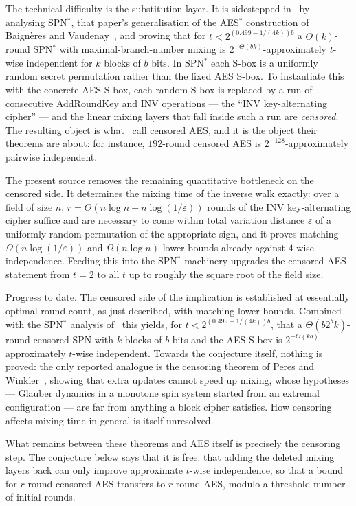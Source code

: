 \documentclass{aicr-conjecture}
\newcommand{\INV}{\mathrm{INV}}
\begin{document}
The technical difficulty is the substitution layer. It is sidestepped
in~\cite{LPTV23} by analysing SPN$^{*}$, that paper's generalisation of the
AES$^{*}$ construction of Baign\`eres and Vaudenay~\cite{BV05}, and proving
that for $t < 2^{(0.499 - 1/(4k))b}$ a $\Theta(k)$-round SPN$^{*}$ with
maximal-branch-number mixing is $2^{-\Theta(bk)}$-approximately $t$-wise
independent for $k$ blocks of $b$ bits. In SPN$^{*}$ each S-box is a
uniformly random secret permutation rather than the fixed AES S-box. To
instantiate this with the concrete AES S-box, each random S-box is replaced
by a run of consecutive AddRoundKey and $\INV$ operations --- the ``$\INV$
key-alternating cipher'' --- and the linear mixing layers that fall inside
such a run are \emph{censored}. The resulting object is what~\cite{LPTV23}
call censored AES, and it is the object their theorems are about: for
instance, $192$-round censored AES is $2^{-128}$-approximately pairwise
independent.

The present source removes the remaining quantitative bottleneck on the
censored side. It determines the mixing time of the inverse walk exactly:
over a field of size $n$, $r = \Theta(n \log n + n \log(1/\varepsilon))$
rounds of the $\INV$ key-alternating cipher suffice and are necessary to
come within total variation distance $\varepsilon$ of a uniformly random
permutation of the appropriate sign, and it proves matching
$\Omega(n \log(1/\varepsilon))$ and $\Omega(n \log n)$ lower bounds already
against $4$-wise independence. Feeding this into the SPN$^{*}$ machinery
upgrades the censored-AES statement from $t = 2$ to all $t$ up to roughly
the square root of the field size.

Progress to date. The censored side of the implication is established at
essentially optimal round count, as just described, with matching lower
bounds. Combined with the SPN$^{*}$ analysis of~\cite{LPTV23} this yields,
for $t < 2^{(0.499 - 1/(4k))b}$, that a $\Theta(b 2^{b} k)$-round censored
SPN with $k$ blocks of $b$ bits and the AES S-box is
$2^{-\Theta(kb)}$-approximately $t$-wise independent. Towards the
conjecture itself, nothing is proved: the only reported analogue is the
censoring theorem of Peres and Winkler~\cite{PW11}, showing that extra
updates cannot speed up mixing, whose hypotheses --- Glauber dynamics in a
monotone spin system started from an extremal configuration --- are far
from anything a block cipher satisfies. How censoring affects mixing time
in general is itself unresolved.

What remains between these theorems and AES itself is precisely the
censoring step. The conjecture below says that it is free: that adding the
deleted mixing layers back can only improve approximate $t$-wise
independence, so that a bound for $r$-round censored AES transfers to
$r$-round AES, modulo a threshold number of initial rounds.
\end{document}
